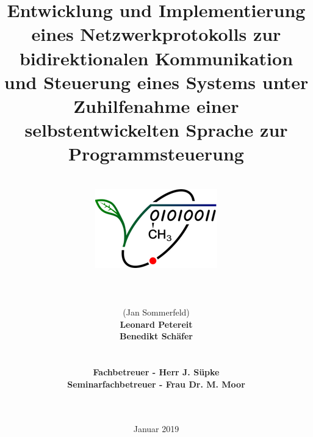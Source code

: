 \documentclass[12pt,a4paper]{scrartcl}
\begin{document}
\title{Entwicklung und Implementierung eines Netzwerkprotokolls zur bidirektionalen Kommunikation und Steuerung eines Systems unter Zuhilfenahme einer selbstentwickelten Sprache zur Programmsteuerung}
\date{Januar 2019}
\author{\hfill\\ 
\includegraphics[scale=2.5]{logo}\hfill\\\hfill\\\hfill\\\hfill\\(Jan Sommerfeld)\\\textbf{Leonard Petereit}\\\textbf{Benedikt Schäfer}\\\hfill\\\hfill\\
\textbf{Fachbetreuer - Herr J. Süpke}\\
\textbf{Seminarfachbetreuer - Frau Dr. M. Moor}
\hfill\\\hfill\\\hfill\\
}
\maketitle
\newpage
\tableofcontents

\newpage

\newpage


\newpage


\newpage


\newpage

\end{document}

